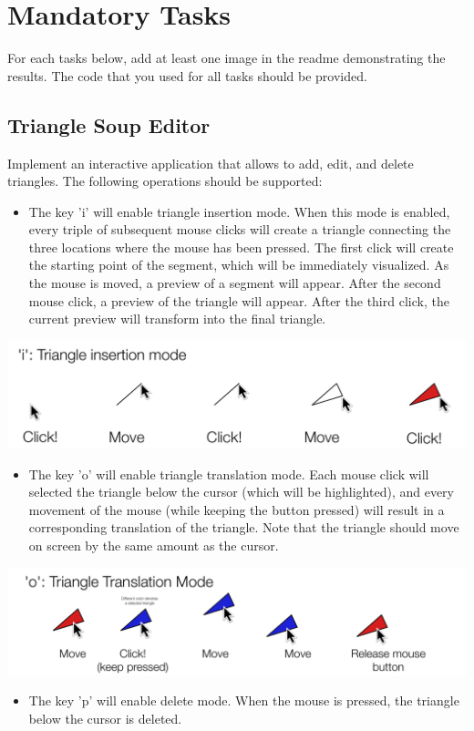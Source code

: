 \documentclass[11pt]{article}
\begin{document}
\section{Mandatory Tasks}
For each tasks below, add at least one image in the readme demonstrating the results. The code that you used for all tasks should be provided.

\subsection{Triangle Soup Editor}

Implement an interactive application that allows to add, edit, and delete triangles. The following operations should be supported:
\begin{itemize}
	\item The key 'i' will enable triangle insertion mode. When this mode is enabled, every triple of subsequent mouse clicks will create a triangle connecting the three locations where the mouse has been pressed. The first click will create the starting point of the segment, which will be immediately visualized. As the mouse is moved, a preview of a segment will appear. After the second mouse click, a preview of the triangle will appear. After the third click, the current preview will transform into the final triangle. 
\end{itemize}
\includegraphics[width=1\textwidth]{i.pdf}
\begin{itemize}
	\item The key 'o' will enable triangle translation mode. Each mouse click will selected the triangle below the cursor (which will be highlighted), and every movement of the mouse (while keeping the button pressed) will result in a corresponding translation of the triangle. Note that the triangle should move on screen by the same amount as the cursor.
\end{itemize}
\includegraphics[width=1\textwidth]{o.pdf}
\begin{itemize}
	\item The key 'p' will enable delete mode. When the mouse is pressed, the triangle below the cursor is deleted.

\end{itemize}
\end{document}
